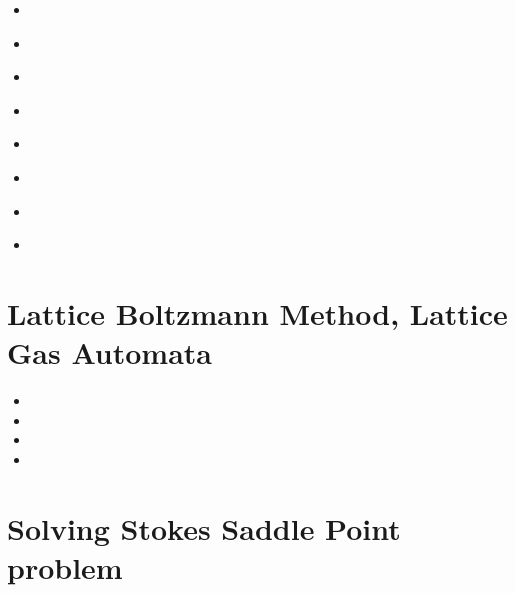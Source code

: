 \begin{scriptsize}
\begin{itemize}
\item[\nineteenninetyfour] 
\item[\nineteenninetyfive] 
 \\ 
\item[\nineteenninetysix] 
 \\
\item[\nineteenninetyseven] 
\item[\nineteenninetyeight] 
 \\
\item[\twothousandthree]
\item[\twothousandfour]
 \\
\item[\twothousandten]
 \\
\end{itemize}
\end{scriptsize}

\section{Lattice Boltzmann Method, Lattice Gas Automata}

\begin{scriptsize}
\begin{itemize}
\item[\nineteeneightyseven]
\item[\twothousandeight]
\item[\twothousandseventeen]
\item[\twothousandeighteen]
\end{itemize}
\end{scriptsize}

\section{Solving Stokes Saddle Point problem}

